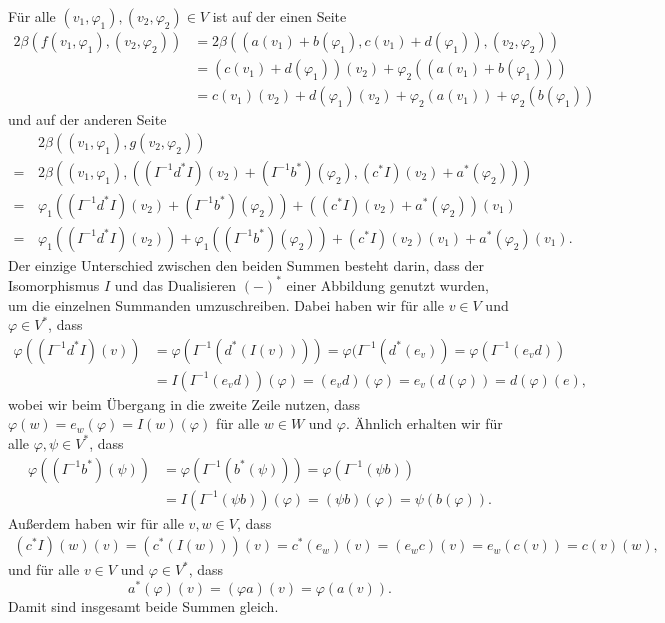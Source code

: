 \documentclass[a4paper,10pt,numbers=noenddot]{scrartcl}
\begin{document}
Für alle $(v_1, \varphi_1), (v_2, \varphi_2) \in V$ ist auf der einen Seite
\begin{align*}
      2\beta(f(v_1, \varphi_1), (v_2, \varphi_2))
  &=  2\beta((a(v_1) + b(\varphi_1), c(v_1) + d(\varphi_1)), (v_2, \varphi_2) )     \\
  &=  ( c(v_1) + d(\varphi_1) )(v_2) + \varphi_2( (a(v_1) + b(\varphi_1)) )         \\
  &=  c(v_1)(v_2) + d(\varphi_1)(v_2) + \varphi_2(a(v_1)) + \varphi_2(b(\varphi_1))
\end{align*}
und auf der anderen Seite
\begin{align*}
   &\,  2\beta( (v_1, \varphi_1), g(v_2, \varphi_2) )                                                                 \\
  =&\,  2\beta( (v_1, \varphi_1), ((I^{-1} d^* I)(v_2) + (I^{-1} b^*)(\varphi_2), (c^* I)(v_2) + a^*(\varphi_2)) )    \\
  =&\,  \varphi_1( (I^{-1} d^* I)(v_2) + (I^{-1} b^*)(\varphi_2) ) + ( (c^* I)(v_2) + a^*(\varphi_2) )(v_1)           \\
  =&\,  \varphi_1((I^{-1} d^* I)(v_2)) + \varphi_1((I^{-1} b^*)(\varphi_2)) + (c^* I)(v_2)(v_1) + a^*(\varphi_2)(v_1).
\end{align*}
Der einzige Unterschied zwischen den beiden Summen besteht darin, dass der Isomorphismus $I$ und das Dualisieren $(-)^*$ einer Abbildung genutzt wurden, um die einzelnen Summanden umzuschreiben.
Dabei haben wir für alle $v \in V$ und $\varphi \in V^*$, dass
\begin{align*}
      \varphi( (I^{-1} d^* I)(v) )
  &=  \varphi( I^{-1}( d^*( I( v ) ) ) )
   =  \varphi( I^{-1}( d^*( e_v ) )
   =  \varphi( I^{-1}( e_v d ) )        \\
  &=  I(I^{-1}(e_v d))(\varphi)
   =  (e_v d)(\varphi)
   =  e_v(d(\varphi))
   =  d(\varphi)(e),
\end{align*}
wobei wir beim Übergang in die zweite Zeile nutzen, dass $\varphi(w) = e_w(\varphi) = I(w)(\varphi)$ für alle $w \in W$ und $\varphi$.
Ähnlich erhalten wir für alle $\varphi, \psi \in V^*$, dass
\begin{align*}
      \varphi((I^{-1} b^*)(\psi))
  &=  \varphi( I^{-1}( b^*(\psi) ) )
   =  \varphi( I^{-1} (\psi b) )      \\
  &=  I( I^{-1}(\psi b) )(\varphi)
   =  (\psi b)(\varphi)
   =  \psi(b(\varphi)).
\end{align*}
Außerdem haben wir für alle $v, w \in V$, dass
\begin{gather*}
    (c^* I)(w)(v)
  = (c^*(I(w)))(v)
  = c^*(e_w)(v)
  = (e_w c)(v)
  = e_w(c(v))
  = c(v)(w),
\end{gather*}
und für alle $v \in V$ und $\varphi \in V^*$, dass
\[
    a^*(\varphi)(v)
  = (\varphi a)(v)
  = \varphi(a(v)).
\]
Damit sind insgesamt beide Summen gleich.
\end{document}
